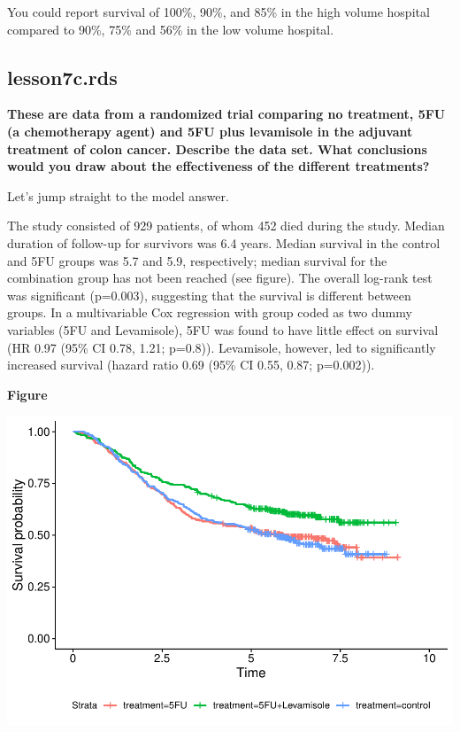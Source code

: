 \documentclass[]{book}
\begin{document}
You could report survival of 100\%, 90\%, and 85\% in the high volume
hospital compared to 90\%, 75\% and 56\% in the low volume hospital.

\hypertarget{lesson7c.rds}{%
\subsection{lesson7c.rds}\label{lesson7c.rds}}

\textbf{These are data from a randomized trial comparing no treatment,
5FU (a chemotherapy agent) and 5FU plus levamisole in the adjuvant
treatment of colon cancer. Describe the data set. What conclusions would
you draw about the effectiveness of the different treatments?}

Let's jump straight to the model answer.

The study consisted of 929 patients, of whom 452 died during the study.
Median duration of follow-up for survivors was 6.4 years. Median
survival in the control and 5FU groups was 5.7 and 5.9, respectively;
median survival for the combination group has not been reached (see
figure). The overall log-rank test was significant (p=0.003), suggesting
that the survival is different between groups. In a multivariable Cox
regression with group coded as two dummy variables (5FU and Levamisole),
5FU was found to have little effect on survival (HR 0.97 (95\% CI 0.78,
1.21; p=0.8)). Levamisole, however, led to significantly increased
survival (hazard ratio 0.69 (95\% CI 0.55, 0.87; p=0.002)).

\textbf{Figure}

\includegraphics{09-answers_files/figure-latex/week7t-1.pdf}
\end{document}
